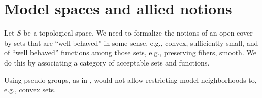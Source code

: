 \documentclass{article}
\begin{document}
\part{Model spaces and allied notions}
\label{part:modeldef}
Let $S$ be a topological space. We need to formalize the notions of an
open cover by sets that are ``well behaved'' in some sense, e.g.,
convex, sufficiently small, and of {\textquotedblleft}well
behaved{\textquotedblright} functions among those sets, e.g., preserving
fibers, smooth. We do this by associating a category of acceptable sets
and functions.

\begin{remark}
Using pseudo-groups, as in \cite[p.~1]{FoundDiffGeo1}, would not allow
restricting model neighborhoods to, e.g., convex sets.
\end{remark}
\end{document}
